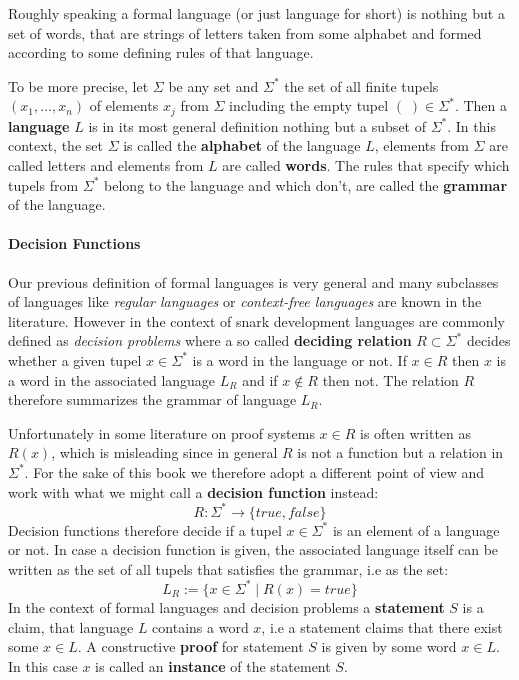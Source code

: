Roughly speaking a formal language (or just language for short) is nothing but a set of words, that are strings of letters taken from some alphabet and formed according to some defining rules of that language. 

To be more precise, let $\Sigma$ be any set and $\Sigma^*$ the set of all finite tupels $(x_1,\ldots,x_n)$ of elements $x_j$ from $\Sigma$ including the empty tupel $(\;)\in \Sigma^*$. Then a \textbf{language} $L$ is in its most general definition nothing but a subset of $\Sigma^*$. In this context, the set $\Sigma$ is called the \textbf{alphabet} of the language $L$, elements from $\Sigma$ are called letters and elements from $L$ are called \textbf{words}. The rules that specify which tupels from $\Sigma^*$ belong to the language and which don't, are called the \textbf{grammar} of the language. 

\paragraph{Decision Functions} Our previous definition of formal languages is very general and many subclasses of languages like \textit{regular languages} or \textit{context-free languages} are known in the literature. However in the context of snark development languages are commonly defined as \textit{decision problems} where a so called \textbf{deciding relation} $R\subset \Sigma^*$ decides whether a given tupel $x\in \Sigma^*$ is a word in the language or not. If $x\in R$ then $x$ is a word in the associated language $L_R$ and if $x\notin R$ then not. The relation $R$ therefore summarizes the grammar of language $L_R$.

Unfortunately in some literature on proof systems $x\in R$ is often written as $R(x)$, which is  misleading since in general $R$ is not a function but a relation in $\Sigma^*$. For the sake of this book we therefore adopt a different point of view and work with what we might call a \textbf{decision function} instead:
\begin{equation}
R: \Sigma^* \to \{true, false\}
\end{equation}
Decision functions therefore decide if a tupel $x\in \Sigma^*$ is an element of a language or not. In case a decision function is given, the associated language itself can be written as the set of all tupels that satisfies the grammar, i.e as the set:
\begin{equation}
L_R := \{x\in \Sigma^*\;|\; R(x)=true\}
\end{equation}
In the context of formal languages and decision problems a \textbf{statement} $S$ is a claim, that language $L$ contains a word $x$, i.e a statement claims that there exist some $x\in L$. A constructive \textbf{proof} for statement $S$ is given by some word $x\in L$. In this case $x$ is called an \textbf{instance} of the statement $S$.


